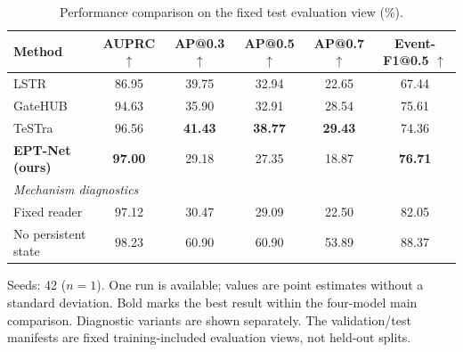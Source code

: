 \begin{table}[t]
\centering
\caption{Performance comparison on the fixed test evaluation view (\%).}
\label{tab:overall-performance}
\begin{tabular}{lccccc}
\toprule
Method & AUPRC $\uparrow$ & AP@0.3 $\uparrow$ & AP@0.5 $\uparrow$ & AP@0.7 $\uparrow$ & Event-F1@0.5 $\uparrow$ \\
\midrule
LSTR & 86.95 & 39.75 & 32.94 & 22.65 & 67.44 \\
GateHUB & 94.63 & 35.90 & 32.91 & 28.54 & 75.61 \\
TeSTra & 96.56 & \textbf{41.43} & \textbf{38.77} & \textbf{29.43} & 74.36 \\
\textbf{EPT-Net (ours)} & \textbf{97.00} & 29.18 & 27.35 & 18.87 & \textbf{76.71} \\
\midrule
\multicolumn{6}{l}{\textit{Mechanism diagnostics}} \\
Fixed reader & 97.12 & 30.47 & 29.09 & 22.50 & 82.05 \\
No persistent state & 98.23 & 60.90 & 60.90 & 53.89 & 88.37 \\
\bottomrule
\end{tabular}
\begin{minipage}{0.98\textwidth}\footnotesize
Seeds: 42 ($n=1$). One run is available; values are point estimates without a standard deviation. Bold marks the best result within the four-model main comparison. Diagnostic variants are shown separately. The validation/test manifests are fixed training-included evaluation views, not held-out splits.
\end{minipage}
\end{table}
